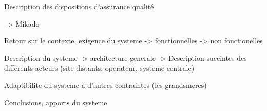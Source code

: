 Description des dispositions d'assurance qualité

--> Mikado

Retour sur le contexte, exigence du systeme
    -> fonctionnelles
    -> non fonctionelles

Description du systeme
   -> architecture generale
   -> Description succintes des differents acteurs (site distants, operateur, systeme centrale)

Adaptibilite du systeme a d'autres contraintes (les grandsmeres)

Conclusions, apports du systeme
